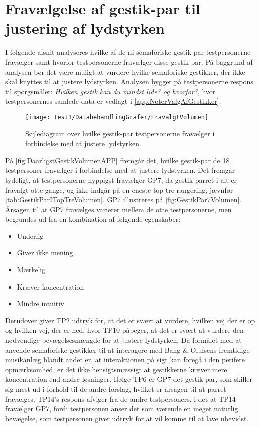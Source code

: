 \section{Fravælgelse af gestik-par til justering af lydstyrken}
\label{app:TestresultaterVolumenDaarlig}
%
I følgende afsnit analyseres hvilke af de ni semaforiske gestik-par testpersonerne fravælger samt hvorfor testpersonerne fravælger disse gestik-par. På baggrund af analysen bør det være muligt at vurdere hvilke semaforiske gestikker, der ikke skal knyttes til at justere lydstyrken. Analysen bygger på testpersonerne respons til spørgsmålet: \textit{Hvilken gestik kan du mindst lide? og hvorfor?}, hvor testpersonernes samlede data er vedlagt i \autoref{app:NoterValgAfGestikker}.
%
\begin{figure}[H]
	\centering
	\texttt{[image: Test1/DatabehandlingGrafer/FravalgtVolumen]}
	\caption{Søjlediagram over hvilke gestik-par testpersonerne fravælger i forbindelse med at justere lydstyrken.}
	\label{fig:DaarligstGestikVolumenAPP}
\end{figure}
\noindent
%
På \autoref{fig:DaarligstGestikVolumenAPP} fremgår det, hvilke gestik-par de 18 testpersoner fravælger i forbindelse med at justere lydstyrken. Det fremgår tydeligt, at testpersonerne hyppigst fravælger GP7, da gestik-parret i alt er fravalgt otte gange, og ikke indgår på en eneste top tre rangering, jævnfør \autoref{tab:GestikParITopTreVolumen}. GP7 illustreres på \autoref{fig:GestikPar7Volumen}. Årsagen til at GP7 fravælges varierer mellem de otte testpersonerne, men begrundes ud fra en kombination af følgende egenskaber:
%
\begin{multicols}{3}
    \begin{itemize}
        \item Underlig
        \item Giver ikke mening
        \item Mærkelig
        \item Kræver koncentration
        \item Mindre intuitiv
\end{itemize}
\end{multicols}
\noindent
% 
Derudover giver TP2 udtryk for, at det er svært at vurdere, hvilken vej der er op og hvilken vej, der er ned, hvor TP10 påpeger, at det er svært at vurdere den nødvendige bevægelsesmængde for at justere lydstyrken. Da formålet med at anvende semaforiske gestikker til at interagere med Bang $\&$ Olufsens fremtidige musikanlæg blandt andet er, at interaktionen på sigt kan foregå i den perifere opmærksomhed, er det ikke hensigtsmæssigt at gestikkerne kræver mere koncentration end andre løsninger. Ifølge TP6 er GP7 det gestik-par, som skiller sig mest ud i forhold til de andre forslag, hvilket er årsagen til at parret fravælges. TP14's respons afviger fra de andre testpersoners, i det at TP14 fravælger GP7, fordi testpersonen anser det som værende en meget naturlig bevægelse, som testpersonen giver udtryk for at vil komme til at lave ubevidst.
